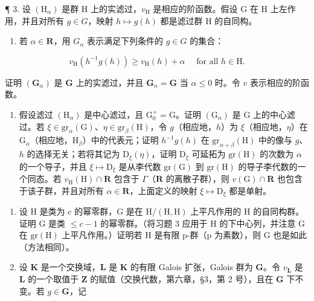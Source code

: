 ¶ 3. 设 \((\mathrm{H}_{\alpha})\) 是群 H 上的实滤过，\(v_{\mathrm{H}}\) 是相应的阶函数。假设 G 在 H 上左作用，并且对所有 \(g \in G\)，映射 \(h \mapsto g(h)\) 都是滤过群 H 的自同构。

\begin{enumerate}
\def\labelenumi{(\alph{enumi})}
\tightlist
\item
  若 \(\alpha \in \mathbf{R}\)，用 \(G_{\alpha}\) 表示满足下列条件的 \(g \in G\) 的集合：
\end{enumerate}

\[
v _ {\mathrm{H}} (h ^ {- 1} g (h)) \geqslant v _ {\mathrm{H}} (h) + \alpha \quad \text { for   all } h \in \mathrm{H}.
\]

证明 \((\mathbf{G}_{\alpha})\) 是 \(\mathbf{G}\) 上的实滤过，并且 \(\mathbf{G}_{\alpha} = \mathbf{G}\) 当 \(\alpha \leqslant 0\) 时。令 \(v\) 表示相应的阶函数。

\begin{enumerate}
\def\labelenumi{(\alph{enumi})}
\setcounter{enumi}{1}
\tightlist
\item
  假设滤过 \((\mathrm{H}_{\alpha})\) 是中心滤过，且 \(\mathrm{G}_0^+ = \mathrm{G}\)。证明 \((\mathrm{G}_{\alpha})\) 是 G 上的中心滤过。若 \(\xi \in \mathrm{gr}_{\alpha}(\mathrm{G})\)、\(\eta \in \mathrm{gr}_{\beta}(\mathrm{H})\)，令 \(g\)（相应地，\(h\)）为 \(\xi\)（相应地，\(\eta\)）在 \(\mathrm{G}_{\alpha}\)（相应地，\(\mathrm{H}_{\beta}\)）中的代表元；证明 \(h^{-1}g(h)\) 在 \(\mathrm{gr}_{\alpha + \beta}(\mathrm{H})\) 中的像与 \(g\)、\(h\) 的选择无关；若将其记为 \(\mathrm{D}_{\xi}(\eta)\)，证明 \(\mathrm{D}_{\xi}\) 可延拓为 \(\mathrm{gr}(\mathrm{H})\) 的次数为 \(\alpha\) 的一个导子，并且 \(\xi \mapsto \mathrm{D}_{\xi}\) 是从李代数 \(\mathrm{gr}(\mathrm{G})\) 到 \(\mathrm{gr}(\mathrm{H})\) 的导子李代数的一个同态。若 \(v_{\mathrm{H}}(\mathrm{H}) \cap \mathbf{R}\) 包含于 \(\Gamma\)（\(\mathbf{R}\) 的离散子群），则 \(v(\mathrm{G}) \cap \mathbf{R}\) 也包含于该子群，并且对所有 \(\alpha \in \mathbf{R}\)，上面定义的映射 \(\xi \mapsto \mathrm{D}_{\xi}\) 都是单射。
\end{enumerate}

\begin{enumerate}
\def\labelenumi{\arabic{enumi}.}
\setcounter{enumi}{3}
\item
  设 H 是类为 c 的幂零群，G 是在 \(\mathrm{H}/(\mathrm{H},\mathrm{H})\) 上平凡作用的 H 的自同构群。证明 G 是类 \(\leqslant c - 1\) 的幂零群。（将习题 3 应用于 H 的下中心列，并注意 G 在 \(\mathrm{gr}(\mathrm{H})\) 上平凡作用。）证明若 H 是有限 p-群（p 为素数），则 G 也是如此（方法相同）。
\item
  设 \(\mathbf{K}\) 是一个交换域，\(\mathbf{L}\) 是 \(\mathbf{K}\) 的有限 Galois 扩张，Galois 群为 \(\mathbf{G}\)。令 \(v_{\mathbf{L}}\) 是 \(\mathbf{L}\) 的一个取值于 \(\mathbf{Z}\) 的赋值（交换代数，第六章，§3，第 2 号），且在 \(\mathbf{G}\) 下不变。若 \(g \in \mathbf{G}\)，记
\end{enumerate}

